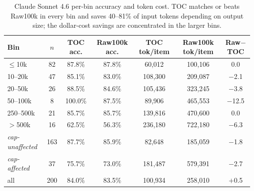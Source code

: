 \documentclass{article}
\begin{document}
\begin{table}[h]
\centering
\scriptsize
\setlength{\tabcolsep}{4pt}
\caption{Claude Sonnet 4.6 per-bin accuracy and token cost. TOC matches or beats Raw100k in every bin and saves 40--81\% of input tokens depending on output size; the dollar-cost savings are concentrated in the larger bins.}
\label{tab:appendix-bin-sonnet}
\begin{tabular}{lcccccc}
\toprule
Bin & $n$ & TOC acc. & Raw100k acc. & TOC tok/item & Raw100k tok/item & Raw$-$TOC \\
\midrule
$\le$10k & 82 & 87.8\% & 87.8\% & 60{,}012 & 100{,}106 & 0.0 \\
10--20k & 47 & 85.1\% & 83.0\% & 108{,}300 & 209{,}087 & $-$2.1 \\
20--50k & 26 & 88.5\% & 84.6\% & 105{,}436 & 323{,}245 & $-$3.8 \\
50--100k & 8 & 100.0\% & 87.5\% & 89{,}906 & 465{,}553 & $-$12.5 \\
250--500k & 21 & 85.7\% & 85.7\% & 139{,}816 & 470{,}600 & 0.0 \\
$>$500k & 16 & 62.5\% & 56.3\% & 236{,}180 & 722{,}180 & $-$6.3 \\
\midrule
\textit{cap-unaffected} & 163 & 87.7\% & 85.9\% & 82{,}648 & 185{,}059 & $-$1.8 \\
\textit{cap-affected} & 37 & 75.7\% & 73.0\% & 181{,}487 & 579{,}391 & $-$2.7 \\
all & 200 & 84.0\% & 83.5\% & 100{,}934 & 258{,}010 & $+$0.5 \\
\bottomrule
\end{tabular}
\end{table}
\end{document}
